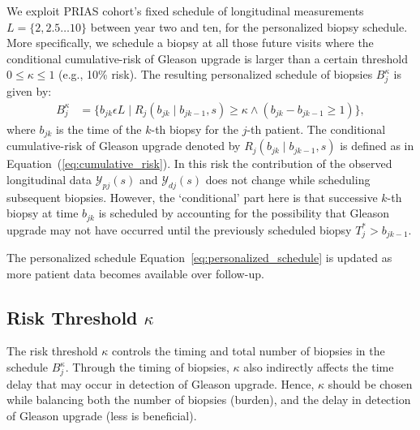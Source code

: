 We exploit PRIAS cohort's fixed schedule of longitudinal measurements ${L=\{2, 2.5 \ldots 10\}}$ between year two and ten, for the personalized biopsy schedule. More specifically, we schedule a biopsy at all those future visits where the conditional cumulative-risk of Gleason upgrade is larger than a certain threshold $0 \leq \kappa \leq 1$ (e.g., 10\% risk). The resulting personalized schedule of biopsies $B_j^{\kappa}$ is given by:
\begin{equation}
\label{eq:personalized_schedule}
\begin{split}
B_j^{\kappa} &= \Big\{b_{jk} \epsilon L \mid R_j(b_{jk} \mid b_{jk-1}, s) \geq \kappa \land (b_{jk}-b_{jk-1}\geq 1) \Big\},
\end{split}
\end{equation}
where $b_{jk}$ is the time of the $k$-th biopsy for the $j$-th patient. The conditional cumulative-risk of Gleason upgrade denoted by $R_j(b_{jk} \mid b_{jk-1}, s)$ is defined as in Equation~(\ref{eq:cumulative_risk}). In this risk the contribution of the observed longitudinal data $\mathcal{Y}_{pj}(s)$ and $\mathcal{Y}_{dj}(s)$ does not change while scheduling subsequent biopsies. However, the `conditional' part here is that successive $k$-th biopsy at time $b_{jk}$ is scheduled by accounting for the possibility that Gleason upgrade may not have occurred until the previously scheduled biopsy $T^*_j > b_{jk-1}$.

The personalized schedule Equation~\ref{eq:personalized_schedule} is updated as more patient data becomes available over follow-up.

\subsection{Risk Threshold $\kappa$}
The risk threshold $\kappa$ controls the timing and total number of biopsies in the schedule $B_j^{\kappa}$. Through the timing of biopsies, $\kappa$ also indirectly affects the time delay that may occur in detection of Gleason upgrade. Hence, $\kappa$ should be chosen while balancing both the number of biopsies (burden), and the delay in detection of Gleason upgrade (less is beneficial).

